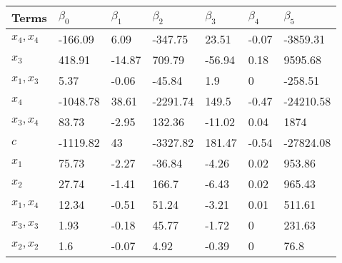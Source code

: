 \begin{tabular}{lllllll}
Terms & $\beta_0$ & $\beta_1$ & $\beta_2$ & $\beta_3$ & $\beta_4$ & $\beta_5$ \\ 
\hline 
$x_4,x_4$ & -166.09 & 6.09 & -347.75 & 23.51 & -0.07 & -3859.31 \\ 
$x_3$ & 418.91 & -14.87 & 709.79 & -56.94 & 0.18 & 9595.68 \\ 
$x_1,x_3$ & 5.37 & -0.06 & -45.84 & 1.9 & 0 & -258.51 \\ 
$x_4$ & -1048.78 & 38.61 & -2291.74 & 149.5 & -0.47 & -24210.58 \\ 
$x_3,x_4$ & 83.73 & -2.95 & 132.36 & -11.02 & 0.04 & 1874 \\ 
$c$ & -1119.82 & 43 & -3327.82 & 181.47 & -0.54 & -27824.08 \\ 
$x_1$ & 75.73 & -2.27 & -36.84 & -4.26 & 0.02 & 953.86 \\ 
$x_2$ & 27.74 & -1.41 & 166.7 & -6.43 & 0.02 & 965.43 \\ 
$x_1,x_4$ & 12.34 & -0.51 & 51.24 & -3.21 & 0.01 & 511.61 \\ 
$x_3,x_3$ & 1.93 & -0.18 & 45.77 & -1.72 & 0 & 231.63 \\ 
$x_2,x_2$ & 1.6 & -0.07 & 4.92 & -0.39 & 0 & 76.8 \\ 
\hline 
\end{tabular}